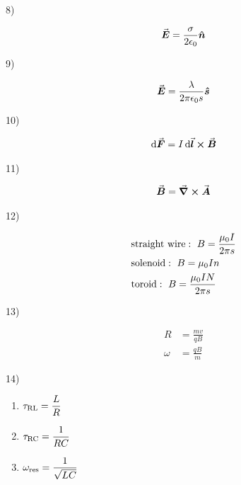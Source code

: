 \documentclass{article}
\begin{document}
\newpage

8) 

\begin{align*}
   \va*{E} = \frac{\sigma}{2 \epsilon_0} \vu*{n} 
\end{align*}

\newpage

9) 

\begin{align*}
   \va*{E} = \frac{\lambda}{2 \pi \epsilon_0 s} \vu*{s}
\end{align*}

\newpage

10)

\begin{align*}
    \dd{\va*{F}} = I \dd{\va*{l}} \cross \va*{B}    
\end{align*}

\newpage

11)

\begin{align*}
   \va*{B} = \grad \cross \va*{A} 
\end{align*}

\newpage

12) 

\begin{align*}
    &{\rm straight~wire}:~ B = \frac{\mu_0 I}{2 \pi s} \\
    &{\rm solenoid}:~ B = \mu_0 I n \\
    &{\rm toroid}:~ B = \frac{\mu_0 I N}{2 \pi s} 
\end{align*}

\newpage

13)

\begin{align*}
    R &= \frac{mv}{qB}  \\
    \omega &= \frac{qB}{m}
\end{align*}

\newpage

14)

\begin{enumerate}
    \item $\displaystyle \tau_{\rm RL} = \frac{L}{R}$ 
    \item $\displaystyle \tau_{\rm RC} = \frac{1}{RC}$
    \item $\displaystyle \omega_{\rm res} = \frac{1}{\sqrt{LC}}$
\end{enumerate}
\end{document}

